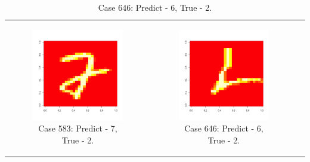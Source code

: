 \documentclass[10pt]{extarticle}
\begin{document}
\begin{table}{}
\begin{tabular}{c c c}
\begin{subfigure}{0.3\textwidth}\centering\includegraphics[scale = .25]{../Images/583.png}\caption{Case 583: Predict - 7, True - 2.}\label{fig:taba}\end{subfigure}&
\newline
\begin{subfigure}{0.3\textwidth}\centering\includegraphics[scale = .25]{../Images/646.png}\caption{Case 646: Predict - 6, True - 2.}\label{fig:taba}\end{subfigure}&

\end{tabular}
\end{table}
\end{document}
